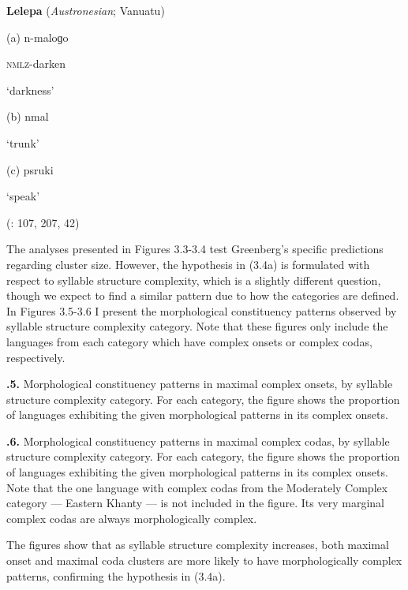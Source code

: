 \ea\label{ex:(3.22)}
   \textbf{Lelepa} (\textit{Austronesian}; Vanuatu)



(a)  n{}-maloɡo



\textsc{nmlz}{}-darken



‘darkness’



(b)  nmal



‘trunk’



(c)  psruki



‘speak’



(\citealt{Lacrampe2014}: 107, 207, 42)

\z


  The analyses presented in Figures 3.3-3.4 test Greenberg’s specific predictions regarding cluster size. However, the hypothesis in (3.4a) is formulated with respect to syllable structure complexity, which is a slightly different question, though we expect to find a similar pattern due to how the categories are defined. In Figures 3.5-3.6 I present the morphological constituency patterns observed by syllable structure complexity category. Note that these figures only include the languages from each category which have complex onsets or complex codas, respectively.





\textbf{.5.} Morphological constituency patterns in maximal complex onsets, by syllable structure complexity category. For each category, the figure shows the proportion of languages exhibiting the given morphological patterns in its complex onsets.





\textbf{.6.} Morphological constituency patterns in maximal complex codas, by syllable structure complexity category. For each category, the figure shows the proportion of languages exhibiting the given morphological patterns in its complex onsets. Note that the one language with complex codas from the Moderately Complex category — Eastern Khanty — is not included in the figure. Its very marginal complex codas are always morphologically complex.



  The figures show that as syllable structure complexity increases, both maximal onset and maximal coda clusters are more likely to have morphologically complex patterns, confirming the hypothesis in (3.4a).



